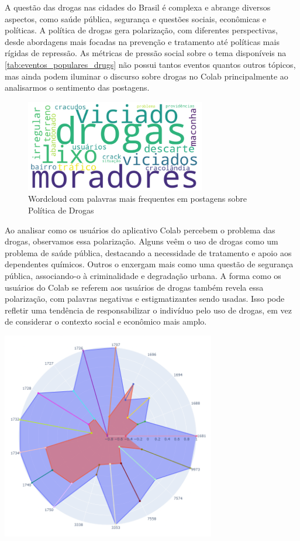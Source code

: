 A questão das drogas nas cidades do Brasil é complexa e abrange diversos aspectos, como saúde pública, segurança e questões sociais, econômicas e políticas. A política de drogas gera polarização, com diferentes perspectivas, desde abordagens mais focadas na prevenção e tratamento até políticas mais rígidas de repressão. As métricas de pressão social sobre o tema disponíveis na \autoref{tab:eventos_populares_drugs} não possui tantos eventos quantos outros tópicos, mas ainda podem iluminar o discurso sobre drogas no Colab principalmente ao analisarmos o sentimento das postagens.

\begin{figure}[htb]
	\centering
	\includegraphics[width=0.7\textwidth]{images/wordcloud_drugs.png}
	\caption{Wordcloud com palavras mais frequentes em postagens sobre Política de Drogas}
	\label{fig:wordcloud_drugs}
\end{figure}

Ao analisar como os usuários do aplicativo Colab percebem o problema das drogas, observamos essa polarização. Alguns veêm o uso de drogas como um problema de saúde pública, destacando a necessidade de tratamento e apoio aos dependentes químicos. Outros o enxergam mais como uma questão de segurança pública, associando-o à criminalidade e degradação urbana. A forma como os usuários do Colab se referem aos usuários de drogas também revela essa polarização, com palavras negativas e estigmatizantes sendo usadas. Isso pode refletir uma tendência de responsabilizar o indivíduo pelo uso de drogas, em vez de considerar o contexto social e econômico mais amplo.

\begin{quadro}[htb]
	\centering
	\includegraphics[width=0.7\textwidth]{images/social_barometer_drugs.png}
	\caption{Gráfico de Radar ilustrando a pressão social em relação ao tópico de Política de Drogas.}
	\label{fig:social_barometer_drugs}
\end{quadro}

